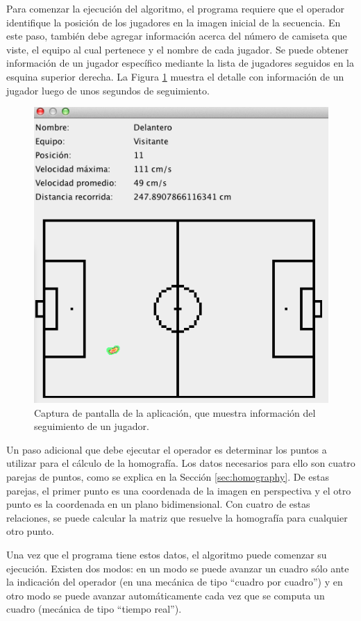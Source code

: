Para comenzar la ejecución del algoritmo, el programa requiere que el operador
identifique la posición de los jugadores en la imagen inicial de la secuencia.
En este paso, también debe agregar información acerca del número de camiseta
que viste, el equipo al cual pertenece y el nombre de cada jugador. Se puede
obtener información de un jugador específico mediante la lista de jugadores
seguidos en la esquina superior derecha. La Figura \ref{fig:screen-jugador}
muestra el detalle con información de un jugador luego de unos segundos de
seguimiento.

\begin{figure}[H]
    \centering
    \captionsetup{justification=centering}
    \includegraphics[width=0.60\linewidth]{./images/Screen-Jugador-Stats.png}
    \caption{Captura de pantalla de la aplicación, que muestra información del seguimiento de un jugador.}
    \label{fig:screen-jugador}
\end{figure}

Un paso adicional que debe ejecutar el operador es determinar los puntos a
utilizar para el cálculo de la homografía. Los datos necesarios para ello son
cuatro parejas de puntos, como se explica en la Sección \ref{sec:homography}. De
estas parejas, el primer punto es una coordenada de la imagen en perspectiva y
el otro punto es la coordenada en un plano bidimensional. Con cuatro de estas
relaciones, se puede calcular la matriz que resuelve la homografía para
cualquier otro punto.

Una vez que el programa tiene estos datos, el algoritmo puede comenzar su
ejecución. Existen dos modos: en un modo se puede avanzar un cuadro sólo ante la
indicación del operador (en una mecánica de tipo ``cuadro por cuadro'') y en
otro modo se puede avanzar automáticamente cada vez que se computa un cuadro
(mecánica de tipo ``tiempo real'').

